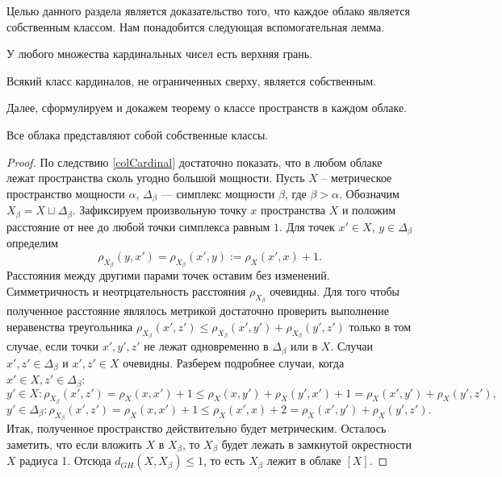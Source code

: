 Целью данного раздела является доказательство того, что каждое облако
является собственным классом. Нам понадобится следующая вспомогательная лемма.

\begin{lemma}
  У любого множества кардинальных чисел есть верхняя грань.
\end{lemma}
\begin{corollary}
  Всякий класс кардиналов, не ограниченных сверху, является собственным.
  \label{colCardinal}
\end{corollary}

Далее, сформулируем и докажем теорему о классе пространств в каждом облаке.
\begin{theorem}
  Все облака представляют собой собственные классы.
\end{theorem}
\begin{proof} По следствию \ref{colCardinal} достаточно показать, что в любом
  облаке лежат пространства сколь угодно большой мощности.  Пусть $X$ --
  метрическое пространство мощности \(\alpha\), \(\Delta_\beta\)  ---
  симплекс мощности
  $\beta$, где $\beta > \alpha$. Обозначим $X_\beta = X \sqcup \Delta_\beta$.
  Зафиксируем произвольную точку $x$ пространства $X$ и положим
  расстояние от нее
  до любой точки симплекса равным $1$. Для точек $x' \in X$,
  $y \in \Delta_\beta$ определим
  \[\rho_{X_\beta}(y,x') = \rho_{X_\beta}(x',y) := \rho_X(x',x) + 1.\]
  Расстояния между другими парами точек оставим без изменений.
  Симметричность и неотрцательность расстояния $\rho_{X_{\beta}}$ очевидны.
  Для того чтобы
  полученное расстояние являлось метрикой достаточно проверить выполнение
  неравенства треугольника
  $\rho_{X_\beta}(x',z') \le \rho_{X_\beta}(x',y') +\rho_{X_\beta}(y',z')$
  только в том случае, если точки $x', y', z'$ не лежат одновременно в
  $\Delta_\beta$ или в $X$. Случаи $x', z' \in \Delta_\beta$ и $ x', z' \in X$
  очевидны. Разберем подробнее случаи, когда $x' \in X, z' \in \Delta_\beta$:
  \[ y' \in X: \rho_{X_\beta}(x', z') = \rho_X(x,x') + 1 \le
  \rho_X(x,y') + \rho_X(y',x') + 1 = \rho_X(x',y') + \rho_X(y',z'),\]
  \[y' \in \Delta_\beta: \rho_{X_\beta}(x', z') = \rho_X(x,x') + 1
  \le \rho_X(x',x) + 2 = \rho_X(x',y') + \rho_X(y',z').\]
  Итак, полученное пространство действительно будет метрическим. Осталось
  заметить, что если вложить $X$ в $X_\beta$, то $X_\beta$ будет лежать в
  замкнутой окрестности $X$ радиуса 1. Отсюда \( d_{GH}(X, X_ \beta )
  \le 1\), то есть \( X_ \beta  \) лежит в облаке \( [X] \).
\end{proof}

